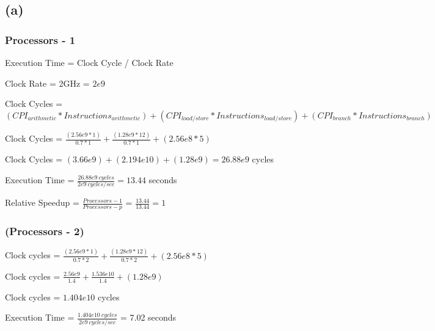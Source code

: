 \documentclass{article}
\begin{document}
    \subsection*{(a)}

    \subsubsection*{Processors - 1}

    Execution Time = Clock Cycle / Clock Rate

    Clock Rate = 2GHz = $2e9$

    \vspace*{6pt}

    Clock Cycles = $(CPI_{arithmetic} * Instructions_{arithmetic}) + (CPI_{load/store} * Instructions_{load/store}) + (CPI_{branch} * Instructions_{branch}) $

    \vspace*{6pt}

    Clock Cycles = $\frac{(2.56e9 * 1)}{0.7 * 1} + \frac{(1.28e9 * 12) }{0.7 * 1}+ (2.56e8 * 5)$

    Clock Cycles = $(3.66e9) + (2.194e{10}) + (1.28e9) = 26.88e9$ cycles

    Execution Time = $\frac{26.88e9\ cycles}{2e9\ cycles/sec} = 13.44$ seconds
    
    \vspace*{6pt}

    Relative Speedup = $\frac{Processors - 1}{Processors - p}$ = $\frac{13.44}{13.44} = 1$ 

    \subsubsection*{(Processors - 2)}

    Clock cycles = $\frac{(2.56e9 * 1)}{0.7 * 2} + \frac{(1.28e9 * 12)}{0.7*2} + (2.56e8 * 5)$

    \vspace*{6pt}

    Clock cycles = $\frac{2.56e9}{1.4} + \frac{1.536e{10}}{1.4} + (1.28e9) $
    
    \vspace*{6pt}

    Clock cycles = $1.404e10$ cycles
    \vspace*{6pt}
    
    Execution Time = $\frac{1.404e10\ cycles}{2e9\ cycles/sec}$ = 7.02 seconds
    \vspace*{6pt}
\end{document}
